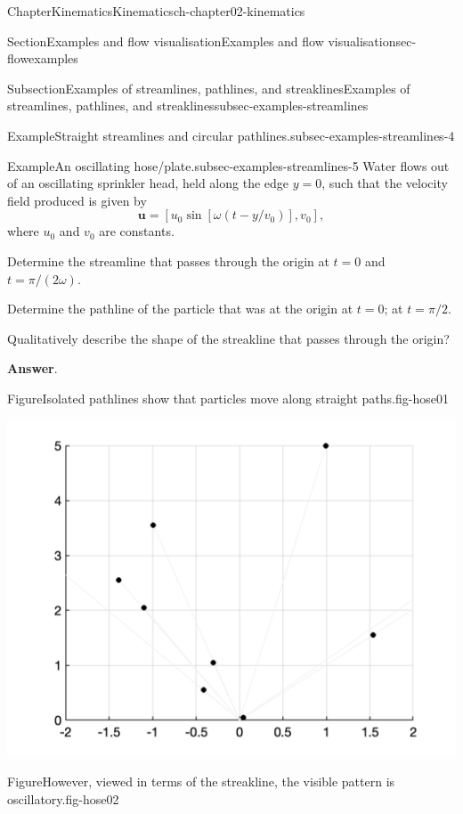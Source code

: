 \documentclass[oneside,10pt,]{book}
\newcommand{\blocktitlefont}{\relax}
\numberwithin{equation}{section}
\newcommand{\bu}{\boldsymbol{u}}
\begin{document}
\begin{chapterptx}{Chapter}{Kinematics}{}{Kinematics}{}{}{ch-chapter02-kinematics}
\begin{sectionptx}{Section}{Examples and flow visualisation}{}{Examples and flow visualisation}{}{}{sec-flowexamples}
\begin{subsectionptx}{Subsection}{Examples of streamlines, pathlines, and streaklines}{}{Examples of streamlines, pathlines, and streaklines}{}{}{subsec-examples-streamlines}
\begin{example}{Example}{Straight streamlines and circular pathlines.}{subsec-examples-streamlines-4}
\end{example}
\begin{example}{Example}{An oscillating hose\slash{}plate.}{subsec-examples-streamlines-5}%
Water flows out of an oscillating sprinkler head, held along the edge \(y = 0\), such that the velocity field produced is given by%
\begin{equation*}
\bu = [u_0 \sin[\omega(t - y/{v_0})], v_0],
\end{equation*}
where \(u_0\) and \(v_0\) are constants.%
\par
Determine the streamline that passes through the origin at \(t = 0\) and \(t = \pi/(2\omega)\).%
\par
Determine the pathline of the particle that was at the origin at \(t = 0\); at \(t = \pi/2\).%
\par
Qualitatively describe the shape of the streakline that passes through the origin?%
\par\smallskip%
\noindent\textbf{\blocktitlefont Answer}.\hypertarget{subsec-examples-streamlines-5-3}{}\quad{}\begin{figureptx}{Figure}{Isolated pathlines show that particles move along straight paths.}{fig-hose01}{}%
\begin{image}{0.1}{0.8}{0.1}{}%
\includegraphics[width=\linewidth]{external/hose01.png}
\end{image}%
\tcblower
\end{figureptx}%
\begin{figureptx}{Figure}{However, viewed in terms of the streakline, the visible pattern is oscillatory.}{fig-hose02}{}%
\begin{image}{0.1}{0.8}{0.1}{}%

\end{image}
\end{figureptx}
\end{example}
\end{subsectionptx}
\end{sectionptx}
\end{chapterptx}
\end{document}
